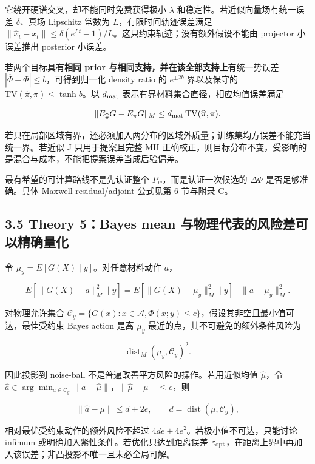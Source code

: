 \documentclass[
  11pt,
  a4paper,
]{article}
\begin{document}
它绕开硬谱交叉，却不能同时免费获得极小 \(\lambda\)
和稳定性。若近似向量场有统一误差 \(\delta\)、真场 Lipschitz 常数为
\(L\)，有限时间轨迹误差满足
\(\|\widehat x_t-x_t\|\le\delta(e^{Lt}-1)/L\)。这只约束轨迹；没有额外假设不能由
projector 小误差推出 posterior 小误差。

若两个目标具有\textbf{相同 prior
与相同支持，并在该全部支持上}有统一势误差
\(|\widehat\Phi-\Phi|\le b\)，可得到归一化 density ratio 的
\(e^{\pm2b}\) 界以及保守的
\(\mathrm{TV}(\widehat\pi,\pi)\le\tanh b\)。以 \(d_{\rm mat}\)
表示有界材料集合直径，相应均值误差满足

\[\|E_{\widehat\pi}G-E_\pi G\|_M\le d_{\rm mat}\,\mathrm{TV}(\widehat\pi,\pi).\]

若只在局部区域有界，还必须加入两分布的区域外质量；训练集均方误差不能充当统一界。若近似
J 只用于提案且完整 MH
正确校正，则目标分布不变，受影响的是混合与成本，不能把提案误差当成后验偏差。

最有希望的可计算路线不是先认证整个 \(P_w\)，而是认证一次候选的
\(\Delta\Phi\) 是否足够准确。具体 Maxwell residual/adjoint 公式见第 6
节与附录 C。

\hypertarget{theory-5bayes-mean-ux4e0eux7269ux7406ux4ee3ux8868ux7684ux98ceux9669ux5deeux53efux4ee5ux7cbeux786eux91cfux5316}{%
\subsection{3.5 Theory 5：Bayes mean
与物理代表的风险差可以精确量化}\label{theory-5bayes-mean-ux4e0eux7269ux7406ux4ee3ux8868ux7684ux98ceux9669ux5deeux53efux4ee5ux7cbeux786eux91cfux5316}}

令 \(\mu_y=E[G(X)\mid y]\)。对任意材料动作 \(a\)，

\[E[\|G(X)-a\|_M^2\mid y]
=E[\|G(X)-\mu_y\|_M^2\mid y]+\|a-\mu_y\|_M^2.\]

对物理允许集合
\(\mathcal{C}_y=\{G(x):x\in\mathcal{A},\Phi(x;y)\le c\}\)，假设其非空且最小值可达，最佳受约束
Bayes action 是离 \(\mu_y\) 最近的点，其不可避免的额外条件风险为

\[\operatorname{dist}_M(\mu_y,\mathcal{C}_y)^2.\]

因此投影到 noise-ball 不是普遍改善平方风险的操作。若用近似均值
\(\widehat\mu\)，令
\(\widehat a\in\arg\min_{a\in\mathcal{C}_y}\|a-\widehat\mu\|\)，\(\|\widehat\mu-\mu\|\le e\)，则

\[\|\widehat a-\mu\|\le d+2e,\qquad d=\operatorname{dist}(\mu,\mathcal{C}_y),\]

相对最优受约束动作的额外风险不超过
\(4de+4e^2\)。若极小值不可达，只能讨论 infimum
或明确加入紧性条件。若优化只达到距离误差
\(\varepsilon_{\rm opt}\)，在距离上界中再加入该误差；非凸投影不唯一且未必全局可解。
\end{document}
